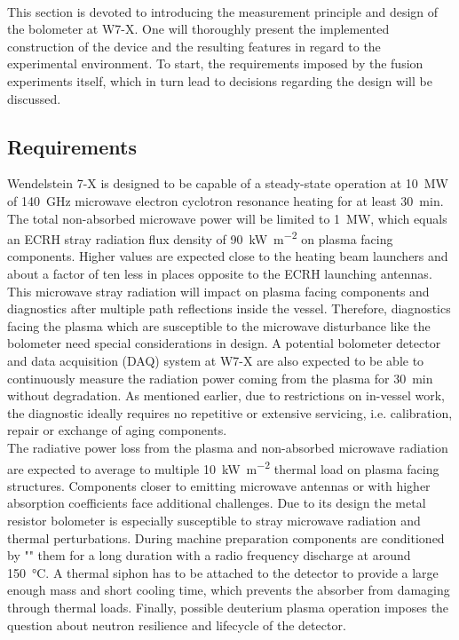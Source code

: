        \,\\%
%
        This section is devoted to introducing the measurement principle and design of the bolometer at W7-X. One will thoroughly present the implemented construction of the device and the resulting features in regard to the experimental environment. To start, the requirements imposed by the fusion experiments itself, which in turn lead to decisions regarding the design will be discussed.%
%
        \subsection{Requirements}\label{sec:requirements}%
%
            Wendelstein 7-X is designed to be capable of a steady-state operation at \SI{10}{\mega\watt} of \SI{140}{\giga\hertz} microwave electron cyclotron resonance heating for at least \SI{30}{\minute}. The total non-absorbed microwave power will be limited to \SI{1}{\mega\watt}, which equals an ECRH stray radiation flux density of \SI{90}{\kilo\watt\per\square\meter} on plasma facing components. Higher values are expected close to the heating beam launchers and about a factor of ten less in places opposite to the ECRH launching antennas\cite{Hathiramani2013}. This microwave stray radiation will impact on plasma facing components and diagnostics after multiple path reflections inside the vessel. Therefore, diagnostics facing the plasma which are susceptible to the microwave disturbance like the bolometer need special considerations in design\cite{Zhang2010}. A potential bolometer detector and data acquisition (DAQ) system at W7-X are also expected to be able to continuously measure the radiation power coming from the plasma for \SI{30}{\minute} without degradation. As mentioned earlier, due to restrictions on in-vessel work, the diagnostic ideally requires no repetitive or extensive servicing, i.e. calibration, repair or exchange of aging components.\\%
            The radiative power loss from the plasma and non-absorbed microwave radiation are expected to average to multiple \SI{10}{\kilo\watt\per\square\meter} thermal load on plasma facing structures. Components closer to emitting microwave antennas or with higher absorption coefficients face additional challenges\cite{Koenig2010,Burhenn2011}. Due to its design the metal resistor bolometer is especially susceptible to stray microwave radiation and thermal perturbations. During machine preparation components are conditioned by "" them for a long duration with a radio frequency discharge at around \SI{150}{\celsius}. A thermal siphon has to be attached to the detector to provide a large enough mass and short cooling time, which prevents the absorber from damaging through thermal loads. Finally, possible deuterium plasma operation imposes the question about neutron resilience and lifecycle of the detector.\\%
